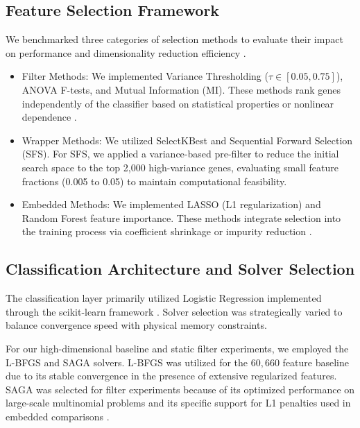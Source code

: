 \documentclass{article}
\begin{document}
\subsection{Feature Selection Framework}

We benchmarked three categories of selection methods to evaluate their impact on performance and dimensionality reduction efficiency \cite{genomic_benchmarking}.

\begin{itemize}
    \item Filter Methods: We implemented Variance Thresholding ($\tau \in [0.05, 0.75]$), ANOVA F-tests, and Mutual Information (MI). These methods rank genes independently of the classifier based on statistical properties or nonlinear dependence \cite{mutual_info}.
    
    \item Wrapper Methods: We utilized SelectKBest and Sequential Forward Selection (SFS). For SFS, we applied a variance-based pre-filter to reduce the initial search space to the top 2,000 high-variance genes, evaluating small feature fractions (0.005 to 0.05) to maintain computational feasibility.
    
    \item Embedded Methods: We implemented LASSO (L1 regularization) and Random Forest feature importance. These methods integrate selection into the training process via coefficient shrinkage or impurity reduction \cite{lasso_foundational}.
\end{itemize}

\subsection{Classification Architecture and Solver Selection}

The classification layer primarily utilized Logistic Regression implemented through the scikit-learn framework \cite{scikit-learn}. Solver selection was strategically varied to balance convergence speed with physical memory constraints.

For our high-dimensional baseline and static filter experiments, we employed the L-BFGS and SAGA solvers. L-BFGS was utilized for the $60{,}660$ feature baseline due to its stable convergence in the presence of extensive regularized features. SAGA was selected for filter experiments because of its optimized performance on large-scale multinomial problems and its specific support for L1 penalties used in embedded comparisons \cite{saga_solver}.
\end{document}
